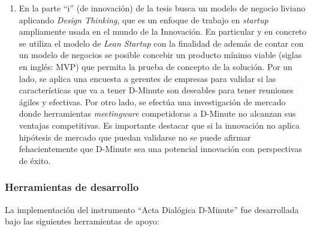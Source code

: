 \begin{enumerate}[A]
	\item En la parte “i” (de innovación) de la tesis busca un modelo de negocio liviano aplicando \textsl{Design Thinking}, que es un enfoque de trabajo en \textsl{startup} ampliamente usada en el mundo de la Innovación. En particular y en concreto se utiliza el modelo de \textsl{Lean Startup} con la finalidad de además de contar con un modelo de negocios se posible concebir un producto mínimo viable (siglas en inglés: MVP) que permita la prueba de concepto de la solución. Por un lado, se aplica una encuesta a gerentes de empresas para validar si las características que va a tener D-Minute son deseables para tener reuniones ágiles y efectivas. Por otro lado, se efectúa una investigación de mercado donde herramientas \textit{meetingware} competidoras a D-Minute no alcanzan sus ventajas competitivas. Es importante destacar que si la innovación no aplica hipótesis de mercado que puedan validarse no se puede afirmar fehacientemente que D-Minute sea una potencial innovación con perspectivas de éxito.
		
\end{enumerate}

\subsubsection{Herramientas de desarrollo}

La implementación del instrumento “Acta Dialógica D-Minute” fue desarrollada bajo las siguientes herramientas de apoyo:

